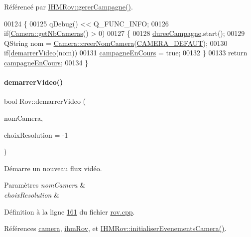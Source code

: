 Référencé par \hyperlink{ihmrov_8cpp_source_l00202}{I\+H\+M\+Rov\+::gerer\+Campagne()}.


\begin{DoxyCode}
00124 \{
00125     qDebug() << Q\_FUNC\_INFO;
00126     \textcolor{keywordflow}{if}(\hyperlink{class_camera_a116b3869ff0647c851715605a1938a3c}{Camera::getNbCameras}() > 0)
00127     \{
00128         \hyperlink{class_rov_a148a0ff28fc2dbed7b65466d77297b8a}{dureeCampagne}.start();
00129         QString nom = \hyperlink{class_camera_a506d459df95042a03894afd5b781c2aa}{Camera::creerNomCamera}(\hyperlink{camera_8h_a87f76384d33bc9bba579afd1d5f3221a}{CAMERA\_DEFAUT});
00130         \textcolor{keywordflow}{if}(\hyperlink{class_rov_aaf1a53557b6e8f0ae2497a0af93bd6db}{demarrerVideo}(nom))
00131             \hyperlink{class_rov_abc9d61d10d8fb5e99283d3775baf98a8}{campagneEnCours} = \textcolor{keyword}{true};
00132     \}
00133     \textcolor{keywordflow}{return} \hyperlink{class_rov_abc9d61d10d8fb5e99283d3775baf98a8}{campagneEnCours};
00134 \}
\end{DoxyCode}
\mbox{\label{class_rov_aaf1a53557b6e8f0ae2497a0af93bd6db}} 
\paragraph{\texorpdfstring{demarrer\+Video()}{demarrerVideo()}}
{\footnotesize\ttfamily bool Rov\+::demarrer\+Video (\begin{DoxyParamCaption}\item[{Q\+String}]{nom\+Camera,  }\item[{int}]{choix\+Resolution = {\ttfamily -\/1} }\end{DoxyParamCaption})}



Démarre un nouveau flux vidéo. 


\begin{DoxyParams}{Paramètres}
{\em nom\+Camera} & \\
\hline
{\em choix\+Resolution} & \\
\hline
\end{DoxyParams}


Définition à la ligne \hyperlink{rov_8cpp_source_l00161}{161} du fichier \hyperlink{rov_8cpp_source}{rov.\+cpp}.



Références \hyperlink{rov_8h_source_l00096}{camera}, \hyperlink{rov_8h_source_l00094}{ihm\+Rov}, et \hyperlink{ihmrov_8cpp_source_l00229}{I\+H\+M\+Rov\+::initialiser\+Evenements\+Camera()}.



